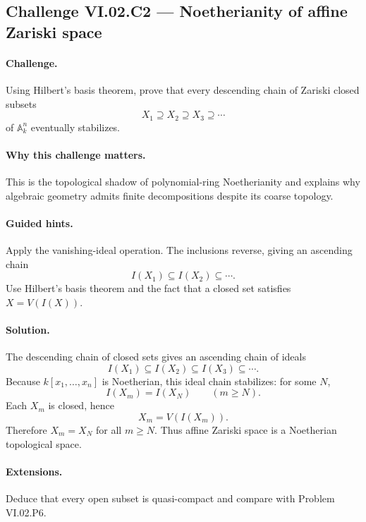 \subsection*{Challenge VI.02.C2 --- Noetherianity of affine Zariski space}
\label{chal:vi02-c2}

\paragraph{Challenge.}
Using Hilbert's basis theorem, prove that every descending chain of Zariski closed subsets
\[
X_1\supseteq X_2\supseteq X_3\supseteq\cdots
\]
of \(\mathbb A_k^n\) eventually stabilizes.

\ifdefined\FullProblemDossiers
\paragraph{Why this challenge matters.}
This is the topological shadow of polynomial-ring Noetherianity and explains why algebraic
geometry admits finite decompositions despite its coarse topology.

\paragraph{Guided hints.}
Apply the vanishing-ideal operation.  The inclusions reverse, giving an ascending chain
\[
I(X_1)\subseteq I(X_2)\subseteq\cdots.
\]
Use Hilbert's basis theorem and the fact that a closed set satisfies \(X=V(I(X))\).

\paragraph{Solution.}
The descending chain of closed sets gives an ascending chain of ideals
\[
I(X_1)\subseteq I(X_2)\subseteq I(X_3)\subseteq\cdots.
\]
Because \(k[x_1,\dots,x_n]\) is Noetherian, this ideal chain stabilizes: for some \(N\),
\[
I(X_m)=I(X_N)\qquad(m\ge N).
\]
Each \(X_m\) is closed, hence
\[
X_m=V(I(X_m)).
\]
Therefore \(X_m=X_N\) for all \(m\ge N\).  Thus affine Zariski space is a Noetherian
topological space.

\paragraph{Extensions.}
Deduce that every open subset is quasi-compact and compare with Problem VI.02.P6.
\fi

